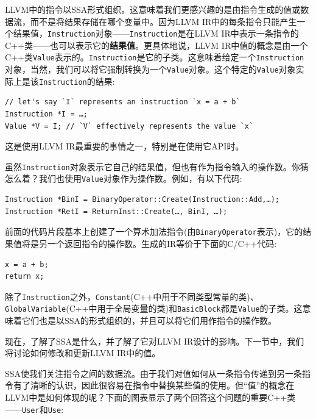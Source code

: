 LLVM中的指令以SSA形式组织。这意味着我们更感兴趣的是由指令生成的值或数据流，而不是将结果存储在哪个变量中。因为LLVM IR中的每条指令只能产生一个结果值，\texttt{Instruction}对象——\texttt{Instruction}是在LLVM IR中表示一条指令的C++类——也可以表示它的\textbf{结果值}。更具体地说，LLVM IR中值的概念是由一个C++类\texttt{Value}表示的。\texttt{Instruction}是它的子类。这意味着给定一个\texttt{Instruction}对象，当然，我们可以将它强制转换为一个\texttt{Value}对象。这个特定的\texttt{Value}对象实际上是该\texttt{Instruction}的结果:

\begin{lstlisting}[style=styleCXX]
// let's say `I` represents an instruction `x = a + b`
Instruction *I = …;
Value *V = I; // `V` effectively represents the value `x`
\end{lstlisting}

这是使用LLVM IR最重要的事情之一，特别是在使用它API时。

虽然\texttt{Instruction}对象表示它自己的结果值，但也有作为指令输入的操作数。你猜怎么着？我们也使用\texttt{Value}对象作为操作数。例如，有以下代码:

\begin{lstlisting}[style=styleCXX]
Instruction *BinI = BinaryOperator::Create(Instruction::Add,…);
Instruction *RetI = ReturnInst::Create(…, BinI, …);
\end{lstlisting}

前面的代码片段基本上创建了一个算术加法指令(由\texttt{BinaryOperator}表示)，它的结果值将是另一个返回指令的操作数。生成的IR等价于下面的C/C++代码:

\begin{lstlisting}[style=styleCXX]
x = a + b;
return x;
\end{lstlisting}

除了\texttt{Instruction}之外，\texttt{Constant}(C++中用于不同类型常量的类)、\texttt{GlobalVariable}(C++中用于全局变量的类)和\texttt{BasicBlock}都是\texttt{Value}的子类。这意味着它们也是以SSA的形式组织的，并且可以将它们用作指令的操作数。

现在，了解了SSA是什么，并了解了它对LLVM IR设计的影响。下一节中，我们将讨论如何修改和更新LLVM IR中的值。


SSA使我们关注指令之间的数据流。由于我们对值如何从一条指令传递到另一条指令有了清晰的认识，因此很容易在指令中替换某些值的使用。但“值”的概念在LLVM中是如何体现的呢？下面的图表显示了两个回答这个问题的重要C++类——\texttt{User}和\texttt{Use}:

